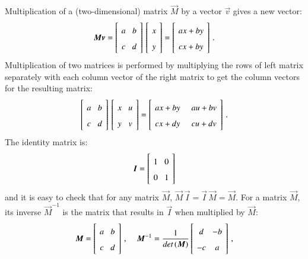Multiplication of a (two-dimensional) matrix $\vec{M}$ by a vector $\vec{v}$ gives a new vector:
\[
\spacearray
\vec{M}\vec{v}=\left[ \begin{array}{c} a\\c\end{array} \begin{array}{c} b\\d \end{array}\right]\, \left[ \begin{array}{c} x\\y\end{array}\right] = \left[ \begin{array}{c} ax+by\\cx+by\end{array}\right]\,.
\]
Multiplication of two matrices is performed by multiplying the rows of left matrix separately with each column vector of the right matrix to get the column vectors for the resulting matrix:
\[
\spacearray
\left[ \begin{array}{c} a\\c\end{array} \begin{array}{c} b\\d \end{array}\right]\, \left[ \begin{array}{c} x\\y\end{array} \begin{array}{c} u\\v\end{array}\right] = \left[ \begin{array}{c} ax+by\\cx+dy\end{array} \;\; \begin{array}{c} au+bv\\cu+dv\end{array}\right]\,.
\]
The identity matrix is:
\[
\spacearray
\vec{I}=\left[\begin{array}{c} 1\\0\end{array} \begin{array}{c} 0\\1\end{array}\right]
\]
and it is easy to check that for any matrix $\vec{M}$, $\vec{M}\, \vec{I} = \vec{I}\, \vec{M} = \vec{M}$.
For a matrix $\vec{M}$, its inverse $\vec{M}^{-1}$ is the matrix that results in $\vec{I}$ when multiplied by $\vec{M}$:
\[
\spacearray
\vec{M}=\left[ \begin{array}{c} a\\c\end{array} \begin{array}{c} b\\d \end{array}\right]\,,\;\;\;\;
\vec{M}^{-1}=\frac{1}{\textit{det}\,(\vec{M})}\left[ \begin{array}{c} d\\-c\end{array} \begin{array}{c} -b\\a \end{array}\right]\,,
\]
